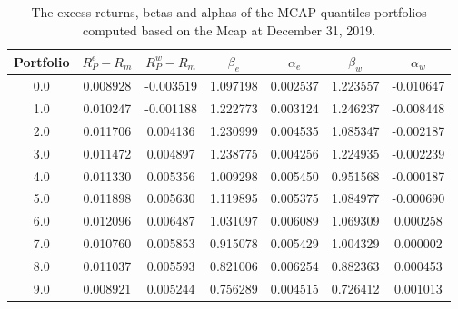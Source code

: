 \documentclass[10pt]{article}
\newenvironment{exercise}[2][Exercise]{\begin{trivlist}
  \item[\hskip \labelsep {\bfseries #1}\hskip \labelsep {\bfseries #2.}]}{\end{trivlist}}
\begin{document}
\begin{exercise}{2}
\begin{table}
\centering
\begin{tabular}{|c|cccccc|}
\toprule
Portfolio &  $R^{e}_{P} - R_m$&  $R^{w}_{P} - R_m$ &    $\beta_e$ &   $\alpha_e$ &    $\beta_w$ &  $\alpha_w$ \\
\midrule
0.0           &  0.008928 & -0.003519 &  1.097198 &  0.002537 &  1.223557 & -0.010647 \\
1.0           &  0.010247 & -0.001188 &  1.222773 &  0.003124 &  1.246237 & -0.008448 \\
2.0           &  0.011706 &  0.004136 &  1.230999 &  0.004535 &  1.085347 & -0.002187 \\
3.0           &  0.011472 &  0.004897 &  1.238775 &  0.004256 &  1.224935 & -0.002239 \\
4.0           &  0.011330 &  0.005356 &  1.009298 &  0.005450 &  0.951568 & -0.000187 \\
5.0           &  0.011898 &  0.005630 &  1.119895 &  0.005375 &  1.084977 & -0.000690 \\
6.0           &  0.012096 &  0.006487 &  1.031097 &  0.006089 &  1.069309 &  0.000258 \\
7.0           &  0.010760 &  0.005853 &  0.915078 &  0.005429 &  1.004329 &  0.000002 \\
8.0           &  0.011037 &  0.005593 &  0.821006 &  0.006254 &  0.882363 &  0.000453 \\
9.0           &  0.008921 &  0.005244 &  0.756289 &  0.004515 &  0.726412 &  0.001013 \\
\bottomrule
\end{tabular}
\caption{The excess returns, betas and alphas of the MCAP-quantiles portfolios
  computed based on the Mcap at December 31, 2019.}
\label{tbl:december2019}
\end{table}



\end{exercise}
\end{document}
